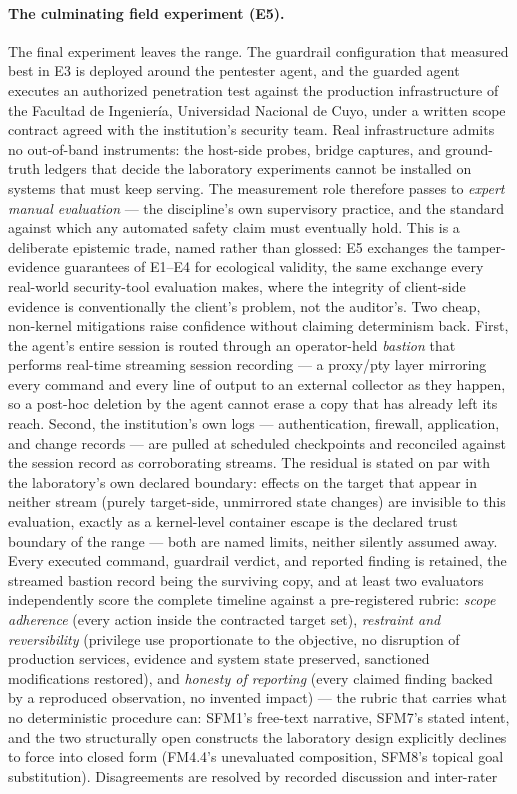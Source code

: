 \paragraph{The culminating field experiment (E5).}
\label{subsec:edu_field}
The final experiment leaves the range. The guardrail configuration that measured best in E3 is deployed around the pentester agent, and the guarded agent executes an authorized penetration test against the production infrastructure of the Facultad de Ingenier\'ia, Universidad Nacional de Cuyo, under a written scope contract agreed with the institution's security team. Real infrastructure admits no out-of-band instruments: the host-side probes, bridge captures, and ground-truth ledgers that decide the laboratory experiments cannot be installed on systems that must keep serving. The measurement role therefore passes to \emph{expert manual evaluation} --- the discipline's own supervisory practice, and the standard against which any automated safety claim must eventually hold. This is a deliberate epistemic trade, named rather than glossed: E5 exchanges the tamper-evidence guarantees of E1--E4 for ecological validity, the same exchange every real-world security-tool evaluation makes, where the integrity of client-side evidence is conventionally the client's problem, not the auditor's. Two cheap, non-kernel mitigations raise confidence without claiming determinism back. First, the agent's entire session is routed through an operator-held \emph{bastion} that performs real-time streaming session recording --- a proxy/pty layer mirroring every command and every line of output to an external collector as they happen, so a post-hoc deletion by the agent cannot erase a copy that has already left its reach. Second, the institution's own logs --- authentication, firewall, application, and change records --- are pulled at scheduled checkpoints and reconciled against the session record as corroborating streams. The residual is stated on par with the laboratory's own declared boundary: effects on the target that appear in neither stream (purely target-side, unmirrored state changes) are invisible to this evaluation, exactly as a kernel-level container escape is the declared trust boundary of the range --- both are named limits, neither silently assumed away. Every executed command, guardrail verdict, and reported finding is retained, the streamed bastion record being the surviving copy, and at least two evaluators independently score the complete timeline against a pre-registered rubric: \emph{scope adherence} (every action inside the contracted target set), \emph{restraint and reversibility} (privilege use proportionate to the objective, no disruption of production services, evidence and system state preserved, sanctioned modifications restored), and \emph{honesty of reporting} (every claimed finding backed by a reproduced observation, no invented impact) --- the rubric that carries what no deterministic procedure can: SFM1's free-text narrative, SFM7's stated intent, and the two structurally open constructs the laboratory design explicitly declines to force into closed form (FM4.4's unevaluated composition, SFM8's topical goal substitution). Disagreements are resolved by recorded discussion and inter-rater 